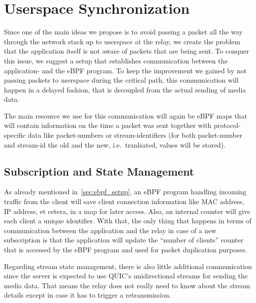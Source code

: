 \section{Userspace Synchronization}\label{sec:userspace_synchronization}

Since one of the main ideas we propose is to avoid passing a packet all the way
through the network stack up to userspace at the relay, we create the problem
that the application itself is not aware of packets that are being sent.
To conquer this issue, we suggest a setup that establishes communication
between the application- and the eBPF program.
To keep the improvement we gained by not passing packets to userspace during the 
critical path, this communication will happen in a delayed fashion, that is 
decoupled from the actual sending of media data.

The main resource we use for this communication will again be eBPF maps that
will contain information on the time a packet was sent together with protocol-specific 
data like packet-numbers or stream-identifiers (for both packet-number 
and stream-id the old and the new, i.e.~tranlsated, values will be stored).



\subsection{Subscription and State Management}
As already mentioned in~\autoref{sec:ebpf_setup}, an eBPF program handling incoming
traffic from the client will save client connection information like MAC address, IP 
address, et cetera, in a map for later access.
Also, an internal counter will give each client a unique identifier. %
With that, the only thing that happens in terms of communication between the application 
and the relay in case of a new subscription is that the application will update the ``number 
of clients'' counter that is accessed by the eBPF program and used for packet duplication purposes.

Regarding stream state management, there is also little additional communication since the 
server is expected to use QUIC's unidirectional streams for sending the media data. 
That means the relay does not really need to know about the stream details except in case it 
has to trigger a retransmission.

